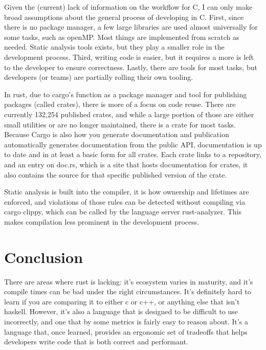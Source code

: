 \documentclass[conference]{IEEEtran}
\begin{document}
{
    Given the (current) lack of information on the workflow for C, I can only make broad assumptions about
    the general process of developing in C. First, since there is no package manager, a few large libraries
    are used almost universally for some tasks, such as openMP. Most things are implemented from scratch as needed.
    Static analysis tools exists, but they play a smaller role in the development process. Third, writing code is easier,
    but it requires a more is left to the developer to ensure correctness. Lastly, there are tools for most tasks, but developers (or teams) are partially
    rolling their own tooling.
}

{
    In rust, due to cargo's function as a package manager and tool for publishing packages (called crates),
    there is more of a focus on code reuse. There are currently 132,254 published crates, and while a large
    portion of those are either small utilities or are no longer maintained, there is a crate for most tasks.
    Because Cargo is also how you  generate documentation and publication automatically generates
    documentation from the public API, documentation is up to date and in at least a basic form for all crates.
    Each crate links to a repository, and an entry on doc.rs, which is a site that hosts documentation for crates,
    it also contains the source for that specific published version of the crate.
}

{
    Static analysis is built into the compiler, it is how ownership and lifetimes are enforced, and violations of those
    rules can be detected without compiling via cargo clippy, which can be called by the language server rust-analyzer.
    This makes compilation less prominent in the development process.
}


\section{Conclusion}
 {
  There are areas where rust is lacking: it's ecosystem varies in maturity, and it's compile times can be bad under the right circumstances.
  It's definitely hard to learn if you are comparing it to either c or c++, or anything else that isn't haskell.
  However, it's also a language that is designed to be difficult to use incorrectly, and one that by some metrics is fairly easy to reason about.
  It's a language that, once learned, provides an ergonomic set of tradeoffs that helps developers write code that is both correct and performant.
 }
\end{document}
